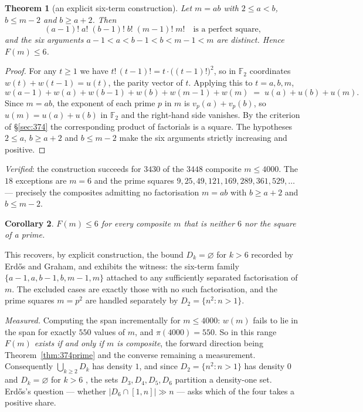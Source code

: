 \documentclass[11pt]{article}
\newtheorem{theorem}{Theorem}
\newtheorem{corollary}[theorem]{Corollary}
\begin{document}
\begin{theorem}[an explicit six-term construction]\label{thm:374six}
Let $m=ab$ with $2\le a<b$, $b\le m-2$ and $b\ge a+2$.  Then
\[
  (a{-}1)!\;a!\;(b{-}1)!\;b!\;(m{-}1)!\;m!\quad\text{is a perfect square,}
\]
and the six arguments $a{-}1<a<b{-}1<b<m{-}1<m$ are distinct.  Hence $F(m)\le6$.
\end{theorem}

\begin{proof}
For any $t\ge1$ we have $t!\,(t-1)!=t\cdot\bigl((t-1)!\bigr)^{2}$, so in $\mathbb F_2$
coordinates $w(t)+w(t-1)=u(t)$, the parity vector of $t$.  Applying this to $t=a,b,m$,
\[
  w(a{-}1)+w(a)+w(b{-}1)+w(b)+w(m{-}1)+w(m)\;=\;u(a)+u(b)+u(m).
\]
Since $m=ab$, the exponent of each prime $p$ in $m$ is $v_p(a)+v_p(b)$, so
$u(m)=u(a)+u(b)$ in $\mathbb F_2$ and the right-hand side vanishes.  By the criterion of
\S\ref{sec:374} the corresponding product of factorials is a square.  The hypotheses
$2\le a$, $b\ge a+2$ and $b\le m-2$ make the six arguments strictly increasing and
positive.
\end{proof}

\emph{Verified}: the construction succeeds for $3430$ of the $3448$ composite $m\le4000$.
The $18$ exceptions are $m=6$ and the prime squares $9,25,49,121,169,289,361,529,\dots$ ---
precisely the composites admitting no factorisation $m=ab$ with $b\ge a+2$ and $b\le m-2$.

\begin{corollary}\label{cor:374bound}
$F(m)\le6$ for every composite $m$ that is neither $6$ nor the square of a prime.
\end{corollary}

This recovers, by explicit construction, the bound $D_k=\varnothing$ for $k>6$ recorded by
Erd\H{o}s and Graham, and exhibits the witness: the six-term family
$\{a{-}1,a,b{-}1,b,m{-}1,m\}$ attached to any sufficiently separated factorisation of $m$.
The excluded cases are exactly those with no such factorisation, and the prime squares
$m=p^{2}$ are handled separately by $D_2=\{n^{2}:n>1\}$.

\emph{Measured.}  Computing the span incrementally for $m\le4000$: $w(m)$ fails to lie in
the span for exactly $550$ values of $m$, and $\pi(4000)=550$.  So in this range
\emph{$F(m)$ exists if and only if $m$ is composite}, the forward direction being
Theorem~\ref{thm:374prime} and the converse remaining a measurement.  Consequently
$\bigcup_{k\ge2}D_k$ has density $1$, and since $D_2=\{n^2:n>1\}$ has density $0$ and
$D_k=\varnothing$ for $k>6$ \cite{ErGr76}, the sets $D_3,D_4,D_5,D_6$ partition a density-one
set.  Erd\H{o}s's question --- whether $|D_6\cap[1,n]|\gg n$ --- asks which of the four
takes a positive share.
\end{document}
